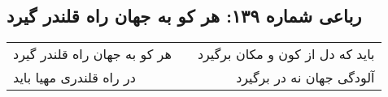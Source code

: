 \begin{center}
\section*{رباعی شماره ۱۳۹: هر کو به جهان راه قلندر گیرد}
\label{sec:sh139}
\begin{longtable}{l p{0.5cm} r}
هر کو به جهان راه قلندر گیرد
&&
باید که دل از کون و مکان برگیرد
\\
در راه قلندری مهیا باید
&&
آلودگی جهان نه در برگیرد
\\
\end{longtable}
\end{center}
